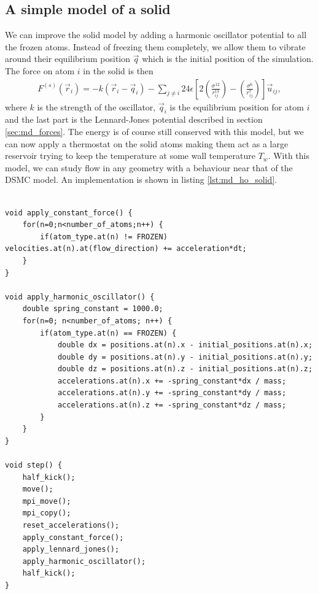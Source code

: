 \subsection{A simple model of a solid}
\label{sec:md_simple_model_of_a_solid}
We can improve the solid model by adding a harmonic oscillator potential to all the frozen atoms. Instead of freezing them completely, we allow them to vibrate around their equilibrium position $\vec q$ which is the initial position of the simulation. The force on atom $i$ in the solid is then
\begin{align}
	F^{(s)}(\vec r_i) = -k(\vec r_i - \vec q_i) 
	- \sum_{j\neq i} 24\epsilon\left[2\left(\frac{\sigma^{12}}{r_{ij}^{13}}\right) - \left(\frac{\sigma^6}{r_{ij}^7}\right)\right]\vec u_{ij},
\end{align}
where $k$ is the strength of the oscillator, $\vec q_i$ is the equilibrium position for atom $i$ and the last part is the Lennard-Jones potential described in section \ref{sec:md_forces}. The energy is of course still conserved with this model, but we can now apply a thermostat on the solid atoms making them act as a large reservoir trying to keep the temperature at some wall temperature $T_w$. With this model, we can study flow in any geometry with a behaviour near that of the DSMC model. An implementation is shown in listing \ref{lst:md_ho_solid}.

\begin{lstlisting}[caption=Implementation of the harmonic oscillator model of a solid., label=lst:md_ho_solid]

void apply_constant_force() {
    for(n=0;n<number_of_atoms;n++) {
        if(atom_type.at(n) != FROZEN) velocities.at(n).at(flow_direction) += acceleration*dt;
    }
}

void apply_harmonic_oscillator() {
    double spring_constant = 1000.0;
    for(n=0; n<number_of_atoms; n++) {
        if(atom_type.at(n) == FROZEN) {
            double dx = positions.at(n).x - initial_positions.at(n).x;
            double dy = positions.at(n).y - initial_positions.at(n).y;
            double dz = positions.at(n).z - initial_positions.at(n).z;
            accelerations.at(n).x += -spring_constant*dx / mass;
            accelerations.at(n).y += -spring_constant*dy / mass;
            accelerations.at(n).z += -spring_constant*dz / mass;
        }
    }
}

void step() {
    half_kick();
    move();
    mpi_move();
    mpi_copy();
    reset_accelerations();
    apply_constant_force();
    apply_lennard_jones();
    apply_harmonic_oscillator();
    half_kick();
}
\end{lstlisting}